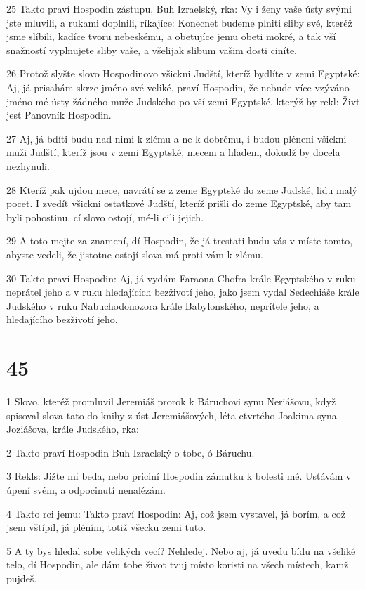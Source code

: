\par 25 Takto praví Hospodin zástupu, Buh Izraelský, rka: Vy i ženy vaše ústy svými jste mluvili, a rukami doplnili, ríkajíce: Konecnet budeme plniti sliby své, kteréž jsme slíbili, kadíce tvoru nebeskému, a obetujíce jemu obeti mokré, a tak vší snažností vyplnujete sliby vaše, a všelijak slibum vašim dosti ciníte.
\par 26 Protož slyšte slovo Hospodinovo všickni Judští, kteríž bydlíte v zemi Egyptské: Aj, já prisahám skrze jméno své veliké, praví Hospodin, že nebude více vzýváno jméno mé ústy žádného muže Judského po vší zemi Egyptské, kterýž by rekl: Živt jest Panovník Hospodin.
\par 27 Aj, já bdíti budu nad nimi k zlému a ne k dobrému, i budou pléneni všickni muži Judští, kteríž jsou v zemi Egyptské, mecem a hladem, dokudž by docela nezhynuli.
\par 28 Kteríž pak ujdou mece, navrátí se z zeme Egyptské do zeme Judské, lidu malý pocet. I zvedít všickni ostatkové Judští, kteríž prišli do zeme Egyptské, aby tam byli pohostinu, cí slovo ostojí, mé-li cili jejich.
\par 29 A toto mejte za znamení, dí Hospodin, že já trestati budu vás v míste tomto, abyste vedeli, že jistotne ostojí slova má proti vám k zlému.
\par 30 Takto praví Hospodin: Aj, já vydám Faraona Chofra krále Egyptského v ruku neprátel jeho a v ruku hledajících bezživotí jeho, jako jsem vydal Sedechiáše krále Judského v ruku Nabuchodonozora krále Babylonského, neprítele jeho, a hledajícího bezživotí jeho.

\chapter{45}

\par 1 Slovo, kteréž promluvil Jeremiáš prorok k Báruchovi synu Neriášovu, když spisoval slova tato do knihy z úst Jeremiášových, léta ctvrtého Joakima syna Joziášova, krále Judského, rka:
\par 2 Takto praví Hospodin Buh Izraelský o tobe, ó Báruchu.
\par 3 Rekls: Jižte mi beda, nebo priciní Hospodin zámutku k bolesti mé. Ustávám v úpení svém, a odpocinutí nenalézám.
\par 4 Takto rci jemu: Takto praví Hospodin: Aj, což jsem vystavel, já borím, a což jsem vštípil, já pléním, totiž všecku zemi tuto.
\par 5 A ty bys hledal sobe velikých vecí? Nehledej. Nebo aj, já uvedu bídu na všeliké telo, dí Hospodin, ale dám tobe život tvuj místo koristi na všech místech, kamž pujdeš.

